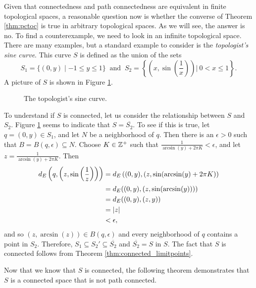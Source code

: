 
Given that connectedness and path connectedness are equivalent in finite topological spaces, a reasonable question now is whether the converse of Theorem \ref{thm:pctoc} is true in arbitrary topological spaces. As we will see, the answer is no. To find a counterexample, we need to look in an infinite topological space. There are many examples, but a standard example to consider is the \emph{topologist's sine curve}. This curve $S$ is defined as the union of the sets
\[S_1 = \{(0,y) \mid -1 \leq y \leq 1\}  \ \text{ and } \ S_2 = \left\{ \left(x,\sin\left(\frac{1}{x}\right)\right) \Big| \ 0 < x \leq 1\right\}.\]
A picture of $S$ is shown in Figure \ref{F:T_sin}.  
\begin{figure}[h]
\begin{center}
\end{center}
\caption{The topologist's sine curve.}
\label{F:T_sin}
\end{figure}



To understand if $S$ is connected, let us consider the relationship between $S$ and $S_2$. Figure \ref{F:T_sin} seems to indicate that $S = \overline{S_2}$. To see if this is true, let $q=(0,y) \in S_1$, and let $N$ be a neighborhood of $q$. Then there is an $\epsilon > 0$ such that $B = B(q, \epsilon) \subseteq N$. Choose $K \in \mathbb{Z}^+$ such that $\frac{1}{\arcsin(y)+2 \pi K} < \epsilon$, and let $z = \frac{1}{\arcsin(y)+2 \pi K}$. Then
\begin{align*}
d_E\left(q,\left(z, \sin\left(\frac{1}{z}\right)\right)\right) &=  d_E\left((0,y),(z, \sin(\arcsin(y)+2 \pi K)\right) \\
	&= d_E((0,y), (z,\sin(\arcsin(y)))) \\
	&= d_E((0,y), (z,y)) \\
	&= \left| z \right| \\
	&< \epsilon,
	\end{align*}
and so $\left(z, \arcsin(z)\right) \in B(q, \epsilon)$ and every neighborhood of $q$ contains a point in $S_2$. Therefore, $S_1 \subseteq S_2' \subseteq \overline{S_2}$ and $\overline{S_2} = S$ in $S$.  The fact that $S$ is connected follows from Theorem \ref{thm:connected_limitpoints}. 

Now that we know that $S$ is connected, the following theorem demonstrates that $S$ is a connected space that is not path connected. 

